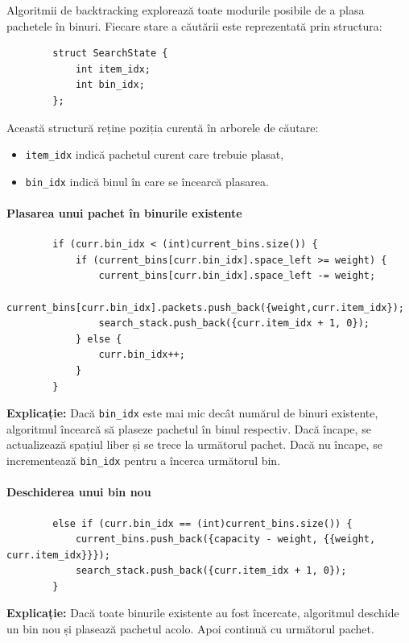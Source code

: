 \documentclass[runningheads]{llncs}
\begin{document}
	Algoritmii de backtracking explorează toate modurile posibile de a plasa pachetele în binuri. Fiecare stare a căutării este reprezentată prin structura:

	\begin{verbatim}
		struct SearchState {
			int item_idx;
			int bin_idx;
		};
	\end{verbatim}

	Această structură reține poziția curentă în arborele de căutare:
	\begin{itemize}
		\item \texttt{item\_idx} indică pachetul curent care trebuie plasat,
		\item \texttt{bin\_idx} indică binul în care se încearcă plasarea.
	\end{itemize}

	\paragraph{\Large Plasarea unui pachet în binurile existente}

	\begin{verbatim}
		if (curr.bin_idx < (int)current_bins.size()) {
			if (current_bins[curr.bin_idx].space_left >= weight) {
				current_bins[curr.bin_idx].space_left -= weight;
				current_bins[curr.bin_idx].packets.push_back({weight,curr.item_idx});
				search_stack.push_back({curr.item_idx + 1, 0});
			} else {
				curr.bin_idx++;
			}
		}
	\end{verbatim}

	\textbf{Explicație:}
	Dacă \texttt{bin\_idx} este mai mic decât numărul de binuri existente, algoritmul încearcă să plaseze pachetul în binul respectiv.
	Dacă încape, se actualizează spațiul liber și se trece la următorul pachet.
	Dacă nu încape, se incrementează \texttt{bin\_idx} pentru a încerca următorul bin.

	\paragraph{\Large Deschiderea unui bin nou}

	\begin{verbatim}
		else if (curr.bin_idx == (int)current_bins.size()) {
			current_bins.push_back({capacity - weight, {{weight, curr.item_idx}}});
			search_stack.push_back({curr.item_idx + 1, 0});
		}
	\end{verbatim}

	\textbf{Explicație:}
	Dacă toate binurile existente au fost încercate, algoritmul deschide un bin nou și plasează pachetul acolo.
	Apoi continuă cu următorul pachet.
\end{document}
